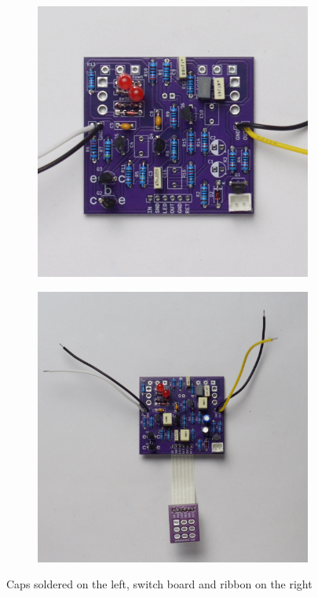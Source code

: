 \documentclass[a4paper,12pt]{article}
\begin{document}
\begin{figure}[h!]
  \centering
  \begin{subfigure}[b]{0.49\textwidth}
    \centering
    \includegraphics[width=\textwidth]{build/15-board-caps-1000px.jpg}
  \end{subfigure}
  \begin{subfigure}[b]{0.49\textwidth}
    \centering
    \includegraphics[width=\textwidth]{build/15-board-daughter-board-1000px.jpg}
  \end{subfigure}
  \caption{Caps soldered on the left, switch board and ribbon
  on the right}
\end{figure}
\end{document}
